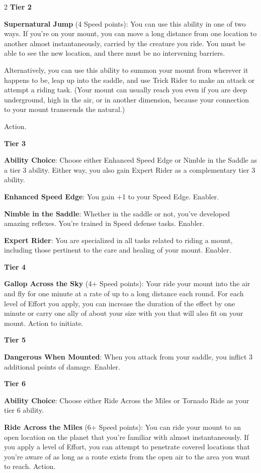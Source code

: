 \begin{multicols}{2}
\textbf{Tier 2}

\textbf{Supernatural Jump} (4 Speed points): You can use this ability in one of two ways. If you’re on your mount, you can move a long distance from one location to another almost instantaneously, carried by the creature you ride. You must be able to see the new location, and there must be no intervening barriers. 

Alternatively, you can use this ability to summon your mount from wherever it happens to be, leap up into the saddle, and use Trick Rider to make an attack or attempt a riding task. (Your mount can usually reach you even if you are deep underground, high in the air, or in another dimension, because your connection to your mount transcends the natural.) 

Action. 

\textbf{Tier 3} 

\textbf{Ability Choice}: Choose either Enhanced Speed Edge or Nimble in the Saddle as a tier 3 ability. Either way, you also gain Expert Rider as a complementary tier 3 ability. 

\textbf{Enhanced Speed Edge}: You gain +1 to your Speed Edge. Enabler. 

\textbf{Nimble in the Saddle}: Whether in the saddle or not, you’ve developed amazing reflexes. You’re trained in Speed defense tasks. Enabler. 

\textbf{Expert Rider}: You are specialized in all tasks related to riding a mount, including those pertinent to the care and healing of your mount. Enabler. 

\textbf{Tier 4}
 
\textbf{Gallop Across the Sky} (4+ Speed points): Your ride your mount into the air and fly for one minute at a rate of up to a long distance each round. For each level of Effort you apply, you can increase the duration of the effect by one minute or carry one ally of about your size with you that will also fit on your mount. Action to initiate. 

\textbf{Tier 5} 

\textbf{Dangerous When Mounted}: When you attack from your saddle, you inflict 3 additional points of damage. Enabler. 

\textbf{Tier 6} 

\textbf{Ability Choice}: Choose either Ride Across the Miles or Tornado Ride as your tier 6 ability. 

\textbf{Ride Across the Miles} (6+ Speed points): You can ride your mount to an open location on the planet that you’re familiar with almost instantaneously. If you apply a level of Effort, you can attempt to penetrate covered locations that you’re aware of as long as a route exists from the open air to the area you want to reach. Action. 


\end{multicols}
